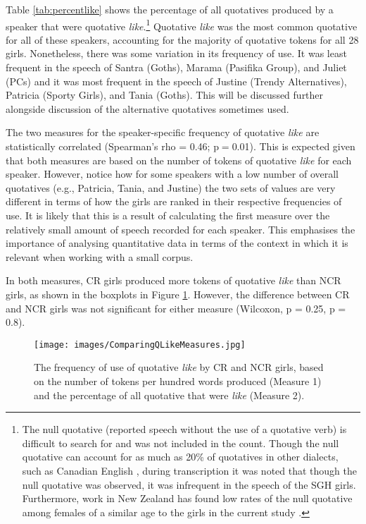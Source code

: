 Table \ref{tab:percentlike} shows the percentage of all quotatives produced by a speaker that were quotative \textit{like}.\footnote{The null quotative (reported speech without the use of a quotative verb) is difficult to search for and was not included in the count.  Though the null quotative can account for as much as 20\% of quotatives in other dialects, such as Canadian English \cite{tagliamontehudson1999}, during transcription it was noted that though the null quotative was observed, it was infrequent in the speech of the SGH girls.  Furthermore, work in New Zealand has found low rates of the null quotative among females of a similar age to the girls in the current study \cite{buchstallerdarcy2009}.}  Quotative \textit{like} was the most common quotative for all of these speakers, accounting for the majority of quotative tokens for all 28 girls.  Nonetheless, there was some variation in its frequency of use.  It was least frequent in the speech of Santra (Goths), Marama (Pasifika Group), and Juliet (PCs) and it was most frequent in the speech of Justine (Trendy Alternatives), Patricia (Sporty Girls), and Tania (Goths).  This will be discussed further alongside discussion of the alternative quotatives sometimes used.


The two measures for the speaker-specific frequency of quotative \textit{like} are statistically correlated (Spearman's rho = 0.46; p$=$0.01).  This is expected given that both measures are based on the number of tokens of quotative \textit{like} for each speaker.  However, notice how for some speakers with a low number of overall quotatives (e.g., Patricia, Tania, and Justine) the two sets of values are very different in terms of how the girls are ranked in their respective frequencies of use. It is likely that this is a result of calculating the first measure over the relatively small amount of speech recorded for each speaker.  This emphasises the importance of analysing quantitative data in terms of the context in which it is relevant when working with a small corpus.  

In both measures, CR girls produced more tokens of quotative \textit{like} than NCR girls, as shown in the boxplots in Figure \ref{fig:ComparingQLikeMeasures}. However, the difference between CR and NCR girls was not significant for either measure (Wilcoxon, p = 0.25, p = 0.8).  

\begin{figure}
	\centering
		\texttt{[image: images/ComparingQLikeMeasures.jpg]}
	\caption{The frequency of use of quotative \textit{like} by CR and NCR girls, based on the number of tokens per hundred words produced (Measure 1) and the percentage of all quotative that were \textit{like} (Measure 2).}
	\label{fig:ComparingQLikeMeasures}
\end{figure}

